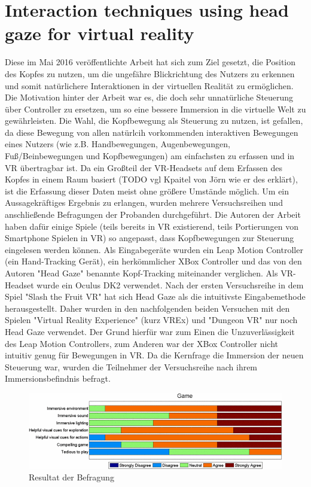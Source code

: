 \section{Interaction techniques using head gaze for virtual reality}

\label{paper1}
Diese im Mai 2016 veröffentlichte Arbeit hat sich zum Ziel gesetzt, die Position des Kopfes zu nutzen, um die ungefähre Blickrichtung des Nutzers zu erkennen und somit natürlichere Interaktionen in der virtuellen Realität zu ermöglichen. Die Motivation hinter der Arbeit war es, die doch sehr unnatürliche Steuerung über Controller zu ersetzen, um so eine bessere Immersion in die virtuelle Welt zu gewährleisten. Die Wahl, die Kopfbewegung als Steuerung zu nutzen, ist gefallen, da diese Bewegung von allen natürlcih vorkommenden interaktiven Bewegungen eines Nutzers (wie z.B. Handbewegungen, Augenbewegungen, Fuß/Beinbewegungen und Kopfbewegungen) am einfachsten zu erfassen und in VR übertragbar ist. Da ein Großteil der VR-Headsets auf dem Erfassen des Kopfes in einem Raum basiert (TODO vgl Kpaitel von Jörn wie er des erklärt), ist die Erfassung dieser Daten meist ohne größere Umstände möglich. Um ein Aussagekräftiges Ergebnis zu erlangen, wurden mehrere Versuchsreihen und anschließende Befragungen der Probanden durchgeführt. Die Autoren der Arbeit haben dafür einige Spiele (teils bereits in VR existierend, teils Portierungen von Smartphone Spielen in VR) so angepasst, dass Kopfbewegungen zur Steuerung eingelesen werden können. Als Eingabegeräte wurden ein Leap Motion Controller (ein Hand-Tracking Gerät), ein herkömmlicher XBox Controller und das von den Autoren "Head Gaze" benannte Kopf-Tracking miteinander verglichen. Als VR-Headset wurde ein Oculus DK2 verwendet. 
Nach der ersten Versuchsreihe in dem Spiel "Slash the Fruit VR" hat sich Head Gaze als die intuitivste Eingabemethode herausgestellt. Daher wurden in den nachfolgenden beiden Versuchen mit den Spielen "Virtual Reality Experience" (kurz VREx) und "Dungeon VR" nur noch Head Gaze verwendet. Der Grund hierfür war zum Einen die Unzuverlässigkeit des Leap Motion Controllers, zum Anderen war der XBox Controller nicht intuitiv genug für Bewegungen in VR. 
Da die Kernfrage die Immersion der neuen Steuerung war, wurden die Teilnehmer der Versuchsreihe nach ihrem Immersionsbefindnis befragt.

\begin{figure}
	\includegraphics[width=\linewidth]{images/study1immersion}
	\caption{Resultat der Befragung}
	\label{fig:result1}
\end{figure}

